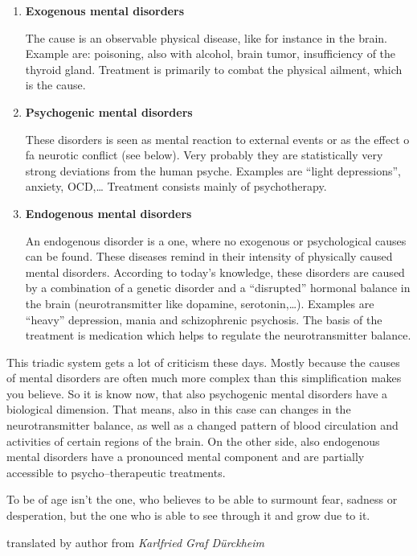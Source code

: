 \documentclass[../main.tex]{subfiles}
\begin{document}
\begin{enumerate}
\item \textbf{Exogenous mental disorders}

  The cause is an observable physical disease, like for instance in the brain.
  Example are: poisoning, also with alcohol, brain tumor, insufficiency of the thyroid gland. 
  Treatment is primarily to combat the physical ailment, which is the cause.

\item \textbf{Psychogenic mental disorders}

  These disorders is seen as mental reaction to external events or as the effect o fa neurotic conflict (see below).
  Very probably they are statistically very strong deviations from the human psyche.
  Examples are ``light depressions'', anxiety, OCD,\ldots
  Treatment consists mainly of psychotherapy.

\item \textbf{Endogenous mental disorders}

  An endogenous disorder is a one, where no exogenous or psychological causes can be found.
  These diseases remind in their intensity of physically caused mental disorders.
  According to today's knowledge, these disorders are caused by a combination of a genetic disorder and
  a ``disrupted'' hormonal balance in the brain (neurotransmitter like dopamine, serotonin,\ldots).
  Examples are ``heavy'' depression, mania and schizophrenic psychosis.
  The basis of the treatment is medication which helps to regulate the neurotransmitter balance.
\end{enumerate}

This triadic system gets a lot of criticism these days.
Mostly because the causes of mental disorders are often much more complex than this simplification makes you believe.
So it is know now, that also psychogenic mental disorders have a biological dimension.
That means, also in this case can changes in the neurotransmitter balance, as well as a changed pattern of blood circulation
and activities of certain regions of the brain.
On the other side, also endogenous mental disorders have a pronounced mental component
and are partially accessible to psycho--therapeutic treatments.

\epigraph{To be of age isn't the one, who believes to be able to surmount fear, sadness or desperation,
  but the one who is able to see through it and grow due to it.}{translated by author from \textit{Karlfried Graf D\"urckheim}}
\end{document}
